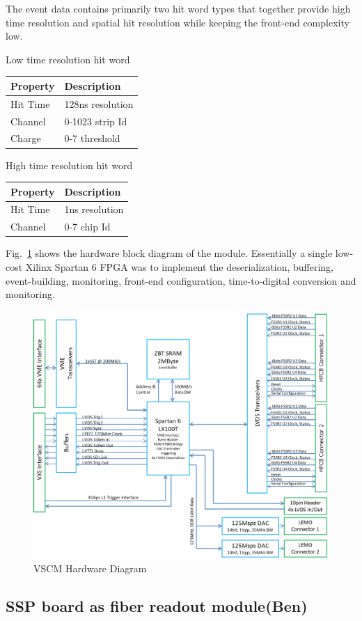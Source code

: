 The event data contains primarily two hit word types that together provide high time resolution and spatial hit resolution while keeping the front-end complexity low.

\begin{center}
	Low time resolution hit word\\
	\begin{tabular}{| l | l |}
		\hline \hline
		Property	& Description		\\
		\hline
		Hit Time	& 128ns resolution	\\
		Channel		& 0-1023 strip Id	\\
		Charge		& 0-7 threshold		\\
		\hline \hline
	\end{tabular}
\end{center}

\begin{center}
	High time resolution hit word\\
	\begin{tabular}{| l | l |}
		\hline \hline
		Property	& Description		\\
		\hline
		Hit Time	& 1ns resolution	\\
		Channel		& 0-7 chip Id		\\
		\hline \hline
	\end{tabular}
\end{center}

Fig.~\ref{fig:vscm_blockdiagram} shows the hardware block diagram of the module. Essentially a single low-cost Xilinx Spartan 6 FPGA was to implement the deserialization, buffering, event-building, monitoring, front-end configuration, time-to-digital conversion and monitoring.

\begin{figure}[hbt]
	\centering
	\includegraphics[width=1.0\columnwidth,keepaspectratio]{img/vscm_blockdiagram.png}
	\caption{VSCM Hardware Diagram}
	\label{fig:vscm_blockdiagram}
\end{figure}


\subsection{SSP board as fiber readout module(Ben)}
